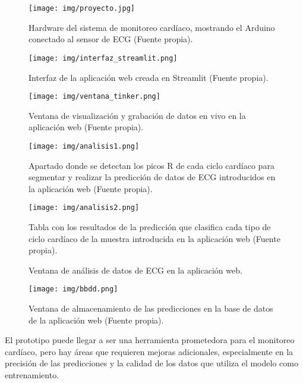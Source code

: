 \begin{figure}[h]
\centering
\texttt{[image: img/proyecto.jpg]}
\caption{Hardware del sistema de monitoreo cardíaco, mostrando el Arduino conectado al sensor de ECG (Fuente propia).}
\label{fig:hardware}
\end{figure}

\begin{figure}[h]
\centering
\texttt{[image: img/interfaz\_streamlit.png]}
\caption{Interfaz de la aplicación web creada en Streamlit (Fuente propia).}
\label{fig:interfaz}
\end{figure}

\begin{figure}[h]
\centering
\texttt{[image: img/ventana\_tinker.png]}
\caption{Ventana de visualización y grabación de datos en vivo en la aplicación web (Fuente propia).}
\label{fig:ventana}
\end{figure}

\begin{figure}[h]
\centering
\begin{minipage}[b]{0.45\textwidth}
\centering
\texttt{[image: img/analisis1.png]}
\caption{Apartado donde se detectan los picos R de cada ciclo cardíaco para segmentar y realizar la predicción de datos de ECG introducidos en la aplicación web (Fuente propia).}
\label{fig:analisis1}
\end{minipage}
\hfill
\begin{minipage}[b]{0.45\textwidth}
\centering
\texttt{[image: img/analisis2.png]}
\caption{Tabla con los resultados de la predicción que clasifica cada tipo de ciclo cardíaco de la muestra introducida en la aplicación web (Fuente propia).}
\label{fig:analisis2}
\end{minipage}
\caption{Ventana de análisis de datos de ECG en la aplicación web.}
\label{fig:analisis}
\end{figure}

\begin{figure}[h]
\centering
\texttt{[image: img/bbdd.png]}
\caption{Ventana de almacenamiento de las predicciones en la base de datos de la aplicación web (Fuente propia).}
\label{fig:bbdd}
\end{figure}

El prototipo puede llegar a ser una herramienta prometedora para el monitoreo cardíaco, pero hay áreas que requieren mejoras adicionales, especialmente en la precisión de las predicciones y la calidad de los datos que utiliza el modelo como entrenamiento.

